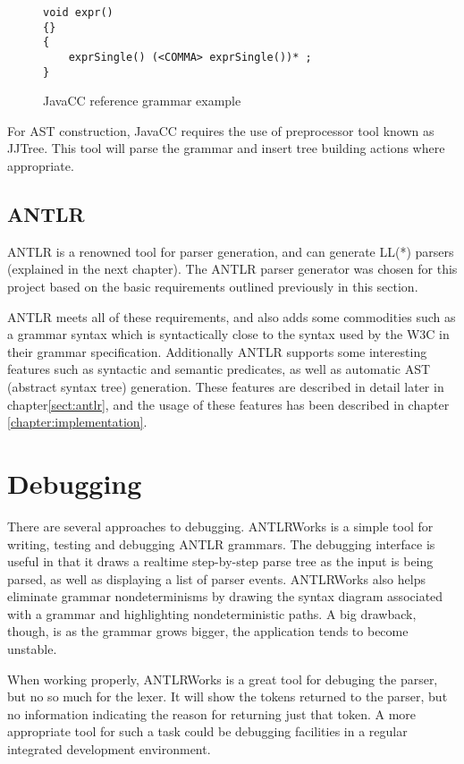 \begin{figure}[h!]
\begin{Verbatim}
void expr()
{}
{
    exprSingle() (<COMMA> exprSingle())* ;
}
\end{Verbatim}
\caption{ JavaCC reference grammar example }
\label{code:parsers:javacc}
\end{figure}

For AST construction, JavaCC requires the use of preprocessor tool known as  
JJTree. This tool will parse the grammar and insert tree building actions where
appropriate. 

\subsection{ANTLR}
ANTLR is a renowned tool for parser generation, and can generate LL(*) parsers
(explained in the next chapter). The ANTLR parser generator was chosen for this
project based on the basic requirements outlined previously in this section.  

ANTLR meets all of these requirements, and also adds some commodities such as a
grammar syntax which is syntactically close to the syntax used by the W3C in
their grammar specification\cite{w3c01}. Additionally ANTLR supports some
interesting features such as syntactic and semantic predicates, as well as
automatic AST (abstract syntax tree) generation. These features are described in
detail later in chapter\ref{sect:antlr}, and the usage of these features has been described
in chapter \ref{chapter:implementation}.


\section{Debugging}
\label{sect:method:debugging}
There are several approaches to debugging. ANTLRWorks \cite{antlrwrks00} is a
simple tool for writing, testing and debugging ANTLR grammars. The debugging
interface is useful in that it draws a realtime step-by-step parse tree as the
input is being parsed, as well as displaying a list of parser events.
ANTLRWorks also helps eliminate grammar nondeterminisms by drawing the syntax
diagram associated with a grammar and highlighting nondeterministic paths. A
big drawback, though, is as the grammar grows bigger, the application tends to
become unstable.    

When working properly, ANTLRWorks is a great tool for debuging the parser, but
no so much for the lexer. It will show the tokens returned to the parser, but
no information indicating the reason for returning just that
token. A more appropriate tool for such a task could be debugging facilities in
a regular integrated development environment. %
